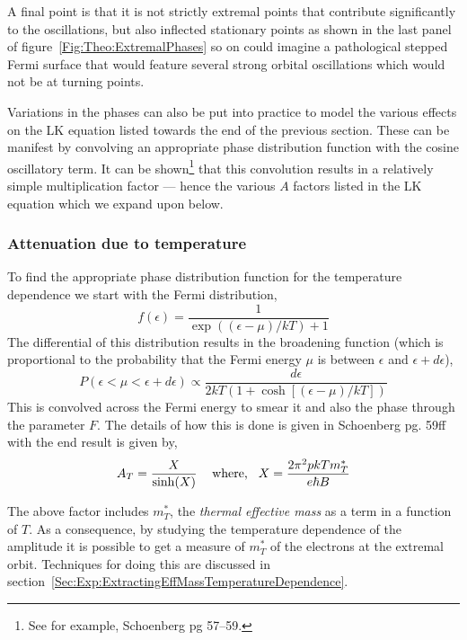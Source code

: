 A final point is that it is not strictly extremal points that contribute significantly to the oscillations, but also inflected stationary points as shown in the last panel of figure~\ref{Fig:Theo:ExtremalPhases} so on could imagine a pathological stepped Fermi surface that would feature several strong orbital oscillations which would not be at turning points.

Variations in the phases can also be put into practice to model the various effects on the \ac{LK} equation listed towards the end of the previous section. These can be manifest by convolving an appropriate phase distribution function with the cosine oscillatory term. It can be shown\footnote{See for example, Schoenberg pg 57--59.\cite{Schoenberg1984}} that this convolution results in a relatively simple multiplication factor --- hence the various $A$ factors listed in the \ac{LK} equation which we expand upon below.

\subsubsection{Attenuation due to temperature}

To find the appropriate phase distribution function for the temperature dependence we start with the Fermi distribution,
\begin{equation}
\label{Eqn:Theo:FermiFunction}
f(\epsilon) = \frac{1}{\exp\left((\epsilon-\mu)/kT\right) + 1}
\end{equation} 
The differential of this distribution results in the broadening function (which is proportional to the probability that the Fermi energy $\mu$ is between $\epsilon$ and $\epsilon + d\epsilon$),
\begin{equation}
  P(\epsilon < \mu < \epsilon + d\epsilon) \propto \frac{d\epsilon}{2kT(1 + \cosh[(\epsilon - \mu)/kT])}
\end{equation}
This is convolved across the Fermi energy to smear it and also the phase through the parameter $F$. The details of how this is done is given in Schoenberg pg. 59ff~\cite{Schoenberg1984} with the end result is given by,
\begin{equation}
  A_T = \frac{X}{\sinh(X)} \textrm{\hspace{0.3cm} where,\hspace{0.3cm}} X = \frac{2\pi^2pkT m^*_T}{e\hbar B}
\end{equation}

The above factor includes $m^*_T$, the \textit{thermal effective mass} as a term in a function of $T$. As a consequence, by studying the temperature dependence of the amplitude it is possible to get a measure of $m^*_T$ of the electrons at the extremal orbit. Techniques for doing this are discussed in section~\ref{Sec:Exp:ExtractingEffMassTemperatureDependence}.

